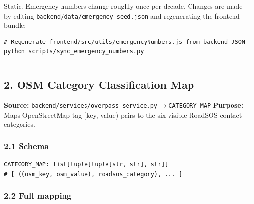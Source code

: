 Static. Emergency numbers change roughly once per decade. Changes are
made by editing \texttt{backend/data/emergency\_seed.json} and
regenerating the frontend bundle:

\begin{verbatim}
# Regenerate frontend/src/utils/emergencyNumbers.js from backend JSON
python scripts/sync_emergency_numbers.py
\end{verbatim}

\begin{center}\rule{0.5\linewidth}{0.5pt}\end{center}

\hypertarget{osm-category-classification-map}{%
\subsection{2. OSM Category Classification
Map}\label{osm-category-classification-map}}

\textbf{Source:} \texttt{backend/services/overpass\_service.py} →
\texttt{CATEGORY\_MAP} \textbf{Purpose:} Maps OpenStreetMap tag (key,
value) pairs to the six visible RoadSOS contact categories.

\hypertarget{schema-1}{%
\subsubsection{2.1 Schema}\label{schema-1}}

\begin{verbatim}
CATEGORY_MAP: list[tuple[tuple[str, str], str]]
# [ ((osm_key, osm_value), roadsos_category), ... ]
\end{verbatim}

\hypertarget{full-mapping}{%
\subsubsection{2.2 Full mapping}\label{full-mapping}}

